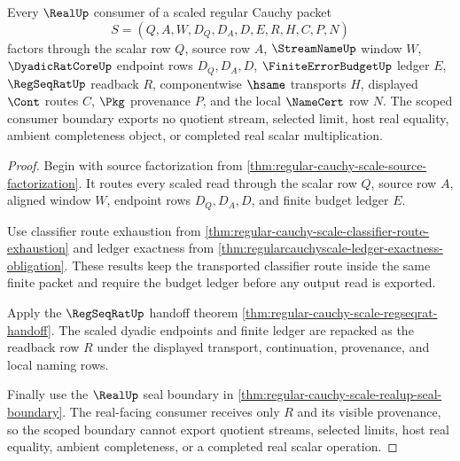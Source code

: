 \begin{theorem}
\label{thm:regular-cauchy-scale-scoped-real-consumer-boundary}
Every $\RealUp$ consumer of a scaled regular Cauchy packet
$$
S=(Q,A,W,D_Q,D_A,D,E,R,H,C,P,N)
$$
factors through the scalar row $Q$, source row $A$, $\StreamNameUp$ window $W$, $\DyadicRatCoreUp$ endpoint rows $D_Q,D_A,D$, $\FiniteErrorBudgetUp$ ledger $E$, $\RegSeqRatUp$ readback $R$, componentwise $\hsame$ transports $H$, displayed $\Cont$ routes $C$, $\Pkg$ provenance $P$, and the local $\NameCert$ row $N$. The scoped consumer boundary exports no quotient stream, selected limit, host real equality, ambient completeness object, or completed real scalar multiplication.
\end{theorem}
\begin{proof}
Begin with source factorization from \autoref{thm:regular-cauchy-scale-source-factorization}. It routes every scaled read through the scalar row $Q$, source row $A$, aligned window $W$, endpoint rows $D_Q,D_A,D$, and finite budget ledger $E$.

Use classifier route exhaustion from \autoref{thm:regular-cauchy-scale-classifier-route-exhaustion} and ledger exactness from \autoref{thm:regularcauchyscale-ledger-exactness-obligation}. These results keep the transported classifier route inside the same finite packet and require the budget ledger before any output read is exported.

Apply the $\RegSeqRatUp$ handoff theorem \autoref{thm:regular-cauchy-scale-regseqrat-handoff}. The scaled dyadic endpoints and finite ledger are repacked as the readback row $R$ under the displayed transport, continuation, provenance, and local naming rows.

Finally use the $\RealUp$ seal boundary in \autoref{thm:regular-cauchy-scale-realup-seal-boundary}. The real-facing consumer receives only $R$ and its visible provenance, so the scoped boundary cannot export quotient streams, selected limits, host real equality, ambient completeness, or a completed real scalar operation.
\end{proof}

